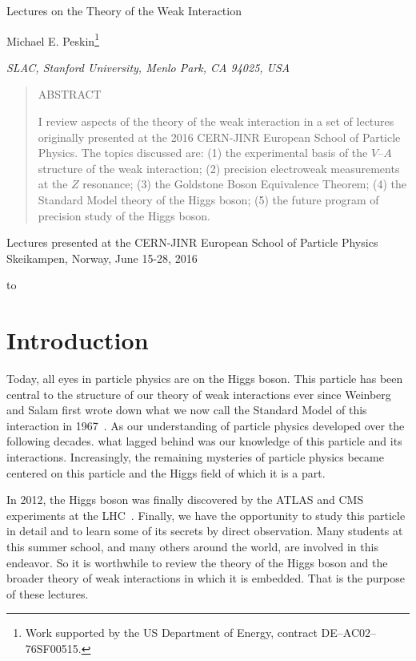 \documentclass[12pt]{article}
\newcommand\pubnumber{SLAC--PUB--17142}
\newcommand\pubdate{August, 2017}
\def\SLAC{SLAC,
    Stanford University, Menlo Park, CA 94025, USA}
\def\doeack{\footnote{Work supported by the US Department of Energy,
                     contract DE--AC02--76SF00515.}}
\def\Title#1{\begin{center} {\Large #1 } \end{center}}
\def\Author#1{\begin{center}{ \sc #1} \end{center}}
\def\Address#1{\begin{center}{ \it #1} \end{center}}
\newcommand\pubblock{\rightline{\begin{tabular}{l} \pubnumber\\
         \pubdate \end{tabular}}}
\newenvironment{Abstract}{\begin{quotation} \begin{center}
                       ABSTRACT
     \end{center}\bigskip  }{\end{quotation}}
\newenvironment{Presented}{
      \begin{center}\begin{large}}{\end{large}\end{center} }
\begin{document}
\begin{titlepage}
\pubblock

\vfill
\Title{Lectures on the Theory of the Weak Interaction}
\vfill
\Author{Michael E. Peskin\doeack}
\bigskip
\Address{\SLAC}
\bigskip
\vfill
\begin{Abstract}
I review aspects of the theory of the weak interaction in a set of
lectures
originally presented at the 2016 CERN-JINR European  School of
Particle Physics.   The
topics discussed are:  (1) the experimental basis of the $V$--$A$
structure
of the weak interaction; (2) precision electroweak measurements at
the $Z$ resonance; (3) the Goldstone Boson Equivalence Theorem; (4)
the Standard Model theory of the Higgs boson; (5)  the future program
of precision study of the Higgs boson.
\end{Abstract}
\vfill
\begin{Presented}
Lectures presented at the CERN-JINR\CR
European School of Particle
Physics\CR 
Skeikampen,
Norway,  
   June 15-28, 2016 
\end{Presented}
\vfill

\newpage

\hbox to\hsize{ \ }

\newpage

\tableofcontents
\end{titlepage}

\def\thefootnote{\fnsymbol{footnote}}
\setcounter{footnote}{0}
%





\newpage



\section{Introduction}

Today, all eyes in particle physics are on the Higgs boson.   This
particle has been central to the structure of our theory of weak
interactions ever since Weinberg and Salam first wrote down what we
now call the Standard Model of this interaction in
1967~\cite{Weinberg,Salam}.  As our understanding of particle physics
developed over the following decades. what lagged behind was our
knowledge of this particle and its interactions.  Increasingly, the
remaining mysteries of particle physics became centered on this
particle and the Higgs field of which it is a part.

In 2012, the Higgs boson was finally discovered by the ATLAS and CMS 
experiments at the LHC~\cite{ATLAS,CMS}.  Finally, 
we have the opportunity to study
this particle in detail and to learn some of its secrets by direct
observation.  Many students at this summer school, and many others
around the world, are involved in this endeavor.   So it is worthwhile
to review the theory of the Higgs boson and the broader theory of weak
interactions in which it is embedded.   That is the purpose of these
lectures.
\end{document}
